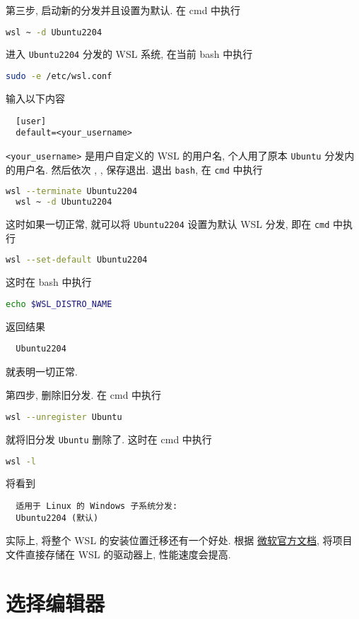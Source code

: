 \documentclass[fontset=founder]{ctexrep}
\begin{document}
第三步,
启动新的分发并且设置为默认.
在 \textsf{cmd} 中执行
\begin{lstlisting}[language=bash]
  wsl ~ -d Ubuntu2204
\end{lstlisting}
进入 \texttt{Ubuntu2204} 分发的 WSL 系统,
在当前 \textsf{bash} 中执行
\begin{lstlisting}[language=bash]
  sudo -e /etc/wsl.conf
\end{lstlisting}
输入以下内容
\begin{lstlisting}
  [user]
  default=<your_username>
\end{lstlisting}
\texttt{<your\_username>} 是用户自定义的 WSL 的用户名,
个人用了原本 \texttt{Ubuntu} 分发内的用户名.
然后依次 , , \keys{\enter} 保存退出.
退出 \texttt{bash},
在 \texttt{cmd} 中执行
\begin{lstlisting}[language=bash]
  wsl --terminate Ubuntu2204
  wsl ~ -d Ubuntu2204
\end{lstlisting}
这时如果一切正常,
就可以将 \texttt{Ubuntu2204} 设置为默认 WSL 分发,
即在 \texttt{cmd} 中执行
\begin{lstlisting}[language=bash]
  wsl --set-default Ubuntu2204
\end{lstlisting}
这时在 \textsf{bash} 中执行
\begin{lstlisting}[language=bash]
  echo $WSL_DISTRO_NAME
\end{lstlisting}
返回结果
\begin{lstlisting}
  Ubuntu2204
\end{lstlisting}
就表明一切正常.

第四步,
删除旧分发.
在 \textsf{cmd} 中执行
\begin{lstlisting}[language=bash]
  wsl --unregister Ubuntu
\end{lstlisting}
就将旧分发 \texttt{Ubuntu} 删除了.
这时在 \textsf{cmd} 中执行
\begin{lstlisting}[language=bash]
  wsl -l
\end{lstlisting}
将看到
\begin{lstlisting}
  适用于 Linux 的 Windows 子系统分发:
  Ubuntu2204 (默认)
\end{lstlisting}

实际上,
将整个 WSL 的安装位置迁移还有一个好处.
根据%
\href{https://learn.microsoft.com/zh-cn/windows/wsl/filesystems#file-storage-and-performance-across-file-systems}{微软官方文档},
将项目文件直接存储在 WSL 的驱动器上,
性能速度会提高.

\section{选择编辑器}
\end{document}
